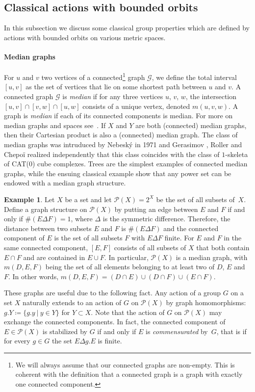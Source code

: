 \documentclass[a4paper]{article}
\theoremstyle{definition}
\newtheorem{exmp}[lem]{Example}
\newcommand{\setst}[2]{\{#1\ |\ #2\}}
\newcommand*{\powerset}[1]{\mathcal P(#1)}
\begin{document}
\subsection{Classical actions with bounded orbits}
%
%
%
In this subsection we discuss some classical group properties which are defined by actions with bounded orbits on various metric spaces.

\paragraph{Median graphs}
For $u$ and $v$ two vertices of a connected\footnote{We will always assume that our connected graphs are non-empty. This is coherent with the definition that a connected graph is a graph with exactly one connected component.} graph $\mathcal G$, we define the total interval $[u,v]$ as the set of vertices that lie on some shortest path between $u$ and $v$.
A connected graph $\mathcal G$ is \emph{median} if for any three vertices $u$, $v$, $w$, the intersection $[u,v]\cap[v,w]\cap[u,w]$ consists of a unique vertex, denoted $m(u,v,w)$.
A graph is \emph{median} if each of its connected components is median. For more on median graphs and spaces see~\cite{MR2405677,MR2671183,MR1705337}.
If $X$ and $Y$ are both (connected) median graphs, then their Cartesian product is also a (connected) median graph.
The class of median graphs was intruduced by Nebesk\'y in 1971 \cite{Neb71} and Gerasimov \cite{Ger97, MR1663779},   Roller \cite{Rol98} and Chepoï \cite{Che00} realized independently that this class coincides with the class of $1$-skeleta of CAT(0) cube complexes.
Trees are the simplest examples of connected median graphs, while the ensuing classical example show that any power set can be endowed with a median graph structure.
%
%
\begin{exmp}\label{Ex:MainMedian}
Let $X$ be a set and let  $\powerset{X}=2^X$ be the set of all subsets of~$X$.
Define a graph structure on $\powerset{X}$ by putting an edge between $E$ and $F$ if and only if $\#(E\Delta F)=1$, where $\Delta$ is the symmetric difference.
Therefore, the distance between two subsets $E$ and $F$ is $\#(E\Delta F)$ and
the connected component of $E$ is the set of all subsets $F$ with $E\Delta F$ finite.
For $E$ and $F$ in the same connected component, $[E,F]$ consists of all subsets of $X$ that both contain $E\cap F$ and are contained in $E\cup F$.
In particular, $\powerset{X}$ is a median graph, with $m(D,E,F)$ being the set of all elements belonging to at least two of $D$, $E$ and~$F$. In other words, $m(D,E,F)=(D\cap E)\cup(D\cap F)\cup(E\cap F)$.
\end{exmp}
%
%
These graphs are useful due to the following fact.
Any action of a group $G$ on a set $X$ naturally extends to an action of $G$ on $\powerset{X}$ by graph homomorphisms: $g.Y\coloneqq\setst{g.y}{y\in Y}$ for $Y\subset X$.
Note that the action of $G$ on $\powerset{X}$ may exchange the connected components.
In fact, the connected component of $E\in \powerset{X}$ is stabilized by $G$ if and only if $E$ is \emph{commensurated} by~$G$, that is if for every $g\in G$ the set $E\Delta g.E$ is finite.
%
%
%
%
\end{document}
